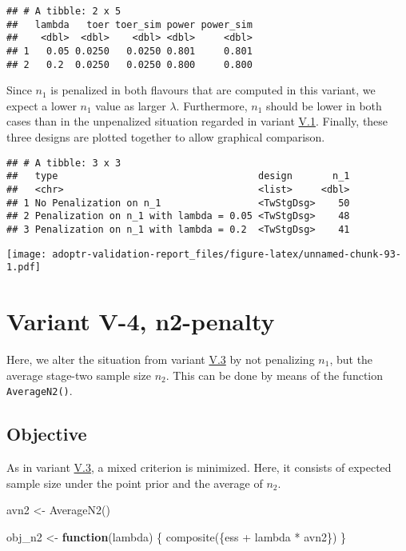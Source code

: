 \documentclass[
]{book}
\newenvironment{Shaded}{\begin{snugshade}}{\end{snugshade}}
\newcommand{\ControlFlowTok}[1]{\textcolor[rgb]{0.13,0.29,0.53}{\textbf{#1}}}
\newcommand{\FunctionTok}[1]{\textcolor[rgb]{0.00,0.00,0.00}{#1}}
\newcommand{\NormalTok}[1]{#1}
\newcommand{\OtherTok}[1]{\textcolor[rgb]{0.56,0.35,0.01}{#1}}
\newcommand{\SpecialCharTok}[1]{\textcolor[rgb]{0.00,0.00,0.00}{#1}}
\begin{document}
\begin{verbatim}
## # A tibble: 2 x 5
##   lambda   toer toer_sim power power_sim
##    <dbl>  <dbl>    <dbl> <dbl>     <dbl>
## 1   0.05 0.0250   0.0250 0.801     0.801
## 2   0.2  0.0250   0.0250 0.800     0.800
\end{verbatim}

Since \(n_1\) is penalized in both flavours that are computed in this variant,
we expect a lower \(n_1\) value as larger \(\lambda\).
Furthermore, \(n_1\) should be lower in both cases than in the unpenalized
situation regarded in variant \protect\hyperlink{variantV_1}{V.1}.
Finally, these three designs are plotted together to allow graphical comparison.

\begin{verbatim}
## # A tibble: 3 x 3
##   type                                   design       n_1
##   <chr>                                  <list>     <dbl>
## 1 No Penalization on n_1                 <TwStgDsg>    50
## 2 Penalization on n_1 with lambda = 0.05 <TwStgDsg>    48
## 3 Penalization on n_1 with lambda = 0.2  <TwStgDsg>    41
\end{verbatim}

\texttt{[image: adoptr-validation-report\_files/figure-latex/unnamed-chunk-93-1.pdf]}

\hypertarget{variantV_4}{%
\section{Variant V-4, n2-penalty}\label{variantV_4}}

Here, we alter the situation from variant \protect\hyperlink{variantV_3}{V.3} by not penalizing
\(n_1\), but the average stage-two sample size \(n_2\).
This can be done by means of the function \texttt{AverageN2()}.

\hypertarget{objective-13}{%
\subsection{Objective}\label{objective-13}}

As in variant \protect\hyperlink{variantV_3}{V.3}, a mixed criterion is minimized.
Here, it consists of expected sample size under the point prior and the
average of \(n_2\).

\begin{Shaded}
\begin{Highlighting}[]
\NormalTok{avn2 }\OtherTok{\textless{}{-}} \FunctionTok{AverageN2}\NormalTok{()}

\NormalTok{obj\_n2 }\OtherTok{\textless{}{-}} \ControlFlowTok{function}\NormalTok{(lambda) \{}
  \FunctionTok{composite}\NormalTok{(\{ess }\SpecialCharTok{+}\NormalTok{ lambda }\SpecialCharTok{*}\NormalTok{ avn2\})}
\NormalTok{\}}
\end{Highlighting}
\end{Shaded}
\end{document}
